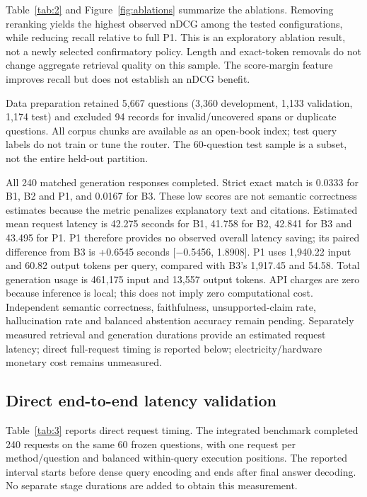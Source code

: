 \documentclass[10pt,a4paper]{article}
\begin{document}
Table~\ref{tab:2} and Figure~\ref{fig:ablations} summarize the ablations. Removing reranking yields the highest observed nDCG among the tested
configurations, while reducing recall relative to full P1. This is an
exploratory ablation result, not a newly selected confirmatory policy.
Length and exact-token removals do not change aggregate retrieval
quality on this sample. The score-margin feature improves recall but
does not establish an nDCG benefit.

Data preparation retained 5,667 questions (3,360 development, 1,133
validation, 1,174 test) and excluded 94 records for invalid/uncovered
spans or duplicate questions. All corpus chunks are available as an
open-book index; test query labels do not train or tune the router. The
60-question test sample is a subset, not the entire held-out partition.

All 240 matched generation responses completed. Strict exact match is
0.0333 for B1, B2 and P1, and 0.0167 for B3. These low scores are not
semantic correctness estimates because the metric penalizes explanatory
text and citations. Estimated mean request latency is 42.275 seconds for
B1, 41.758 for B2, 42.841 for B3 and 43.495 for P1. P1 therefore
provides no observed overall latency saving; its paired difference from
B3 is +0.6545 seconds {[}−0.5456, 1.8908{]}. P1 uses 1,940.22 input and
60.82 output tokens per query, compared with B3's 1,917.45 and 54.58.
Total generation usage is 461,175 input and 13,557 output tokens. API
charges are zero because inference is local; this does not imply zero
computational cost. Independent semantic correctness, faithfulness,
unsupported-claim rate, hallucination rate and balanced abstention
accuracy remain pending. Separately measured retrieval and generation
durations provide an estimated request latency; direct full-request
timing is reported below; electricity/hardware monetary cost remains
unmeasured.

\hypertarget{direct-end-to-end-latency-validation}{%
\subsection{Direct end-to-end latency
validation}\label{direct-end-to-end-latency-validation}}

Table~\ref{tab:3} reports direct request timing. The integrated benchmark completed 240 requests on the same 60 frozen
questions, with one request per method/question and balanced
within-query execution positions. The reported interval starts before
dense query encoding and ends after final answer decoding. No separate
stage durations are added to obtain this measurement.
\end{document}
